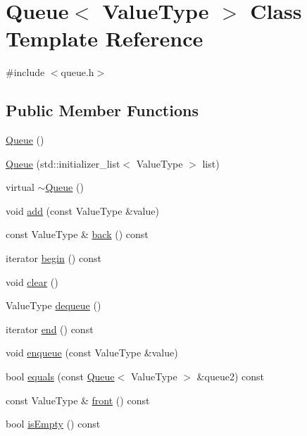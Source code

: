 \hypertarget{classQueue}{}\section{Queue$<$ Value\+Type $>$ Class Template Reference}
\label{classQueue}


{\ttfamily \#include $<$queue.\+h$>$}

\subsection*{Public Member Functions}
\begin{DoxyCompactItemize}
\item 
\mbox{\hyperlink{classQueue_a9419268280646dc4ab7b01d6fa3741c8}{Queue}} ()
\item 
\mbox{\hyperlink{classQueue_a0ad6572f7c8e567d440ef6735d2f4a32}{Queue}} (std\+::initializer\+\_\+list$<$ Value\+Type $>$ list)
\item 
virtual \mbox{\hyperlink{classQueue_a240bdcfcc136e53aeaac3aa454cc26bf}{$\sim$\+Queue}} ()
\item 
void \mbox{\hyperlink{classQueue_ab901606bf3a8019c986f0cf9a9f298dc}{add}} (const Value\+Type \&value)
\item 
const Value\+Type \& \mbox{\hyperlink{classQueue_adc761c91bdacd01bed5c96e25fd9486a}{back}} () const
\item 
iterator \mbox{\hyperlink{classQueue_a0c62c15c8ed609e7e5e9518cf5f5c712}{begin}} () const
\item 
void \mbox{\hyperlink{classQueue_ac8bb3912a3ce86b15842e79d0b421204}{clear}} ()
\item 
Value\+Type \mbox{\hyperlink{classQueue_aaee07e371e2370e76e6c42bada727ba2}{dequeue}} ()
\item 
iterator \mbox{\hyperlink{classQueue_a68b688a51bd0cf6fb5bc2cba292209a8}{end}} () const
\item 
void \mbox{\hyperlink{classQueue_a663f69ed5d98f3f167202e9b2d7e7a9a}{enqueue}} (const Value\+Type \&value)
\item 
bool \mbox{\hyperlink{classQueue_aafa8534374662afc7fedc3e1ffb72c08}{equals}} (const \mbox{\hyperlink{classQueue}{Queue}}$<$ Value\+Type $>$ \&queue2) const
\item 
const Value\+Type \& \mbox{\hyperlink{classQueue_a02aaa52ad7a120201f6dd3e90eff737f}{front}} () const
\item 
bool \mbox{\hyperlink{classQueue_acf82f9b2937375c7b1cf3dccb3df3312}{is\+Empty}} () const

\end{DoxyCompactItemize}
